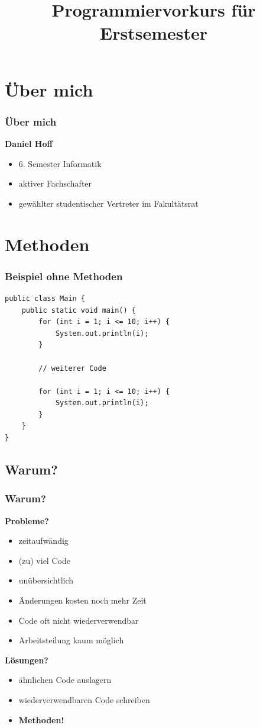 \documentclass[final]{beamer}
\title{Programmiervorkurs für Erstsemester}
\begin{document}
\lstset{tabsize=4}
\lstset{basicstyle=\small}
\lstset{language=java}

\begin{frame}
  \titlepage
\end{frame}

\begin{frame}
  \tableofcontents
\end{frame}

\section{Über mich}
\begin{frame}
	\frametitle{Über mich}
	\textbf{Daniel Hoff}
	\begin{itemize}
		\item{6. Semester Informatik}
		\item{aktiver Fachschafter}
		\item{gewählter studentischer Vertreter im Fakultätsrat}
	\end{itemize}
\end{frame}

\section{Methoden}
\begin{frame}[containsverbatim]
	\frametitle{Beispiel ohne Methoden}
	\begin{lstlisting}
public class Main {
	public static void main() {
		for (int i = 1; i <= 10; i++) {
			System.out.println(i);
		}
		
		// weiterer Code
		
		for (int i = 1; i <= 10; i++) {
			System.out.println(i);
		}
	}
}
	\end{lstlisting}
\end{frame}

\subsection{Warum?}
\begin{frame}
	\frametitle{Warum?}
	\textbf{Probleme?}
	\begin{itemize}
		\item{zeitaufwändig}
		\item{(zu) viel Code}
		\item{unübersichtlich}
		\item{Änderungen kosten noch mehr Zeit}
		\item{Code oft nicht wiederverwendbar}
		\item{Arbeitsteilung kaum möglich}
	\end{itemize}
	\pause
	\vspace{\baselineskip}
	\textbf{Lösungen?}
	\pause
	\begin{itemize}
		\item{ähnlichen Code auslagern}
		\item{wiederverwendbaren Code schreiben}
		\item{\textbf{Methoden!}}
	\end{itemize}
\end{frame}
\end{document}

